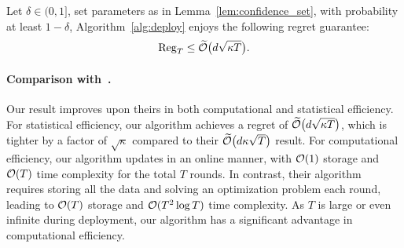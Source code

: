 \begin{myThm}
    \label{thm:deploy}
    Let $\delta \in(0,1]$, set parameters as in Lemma~\ref{lem:confidence_set}, with probability at least $1-\delta$, Algorithm~\ref{alg:deploy} enjoys the following regret guarantee:
    \begin{align*}
      {\operatorname*{Reg}}_T \leq \widetilde{\mathcal{O}} \big(d\sqrt{{\kappa}{T}}\big).
    \end{align*}
\end{myThm}

\paragraph{Comparison with~\citet{NeurIPS'21:Saha-Preference-bandits}.} Our result improves upon theirs in both computational and statistical efficiency. For statistical efficiency, our algorithm achieves a regret of $\widetilde{\mathcal{O}} \big(d\sqrt{{\kappa}{T}}\big)$, which is tighter by a factor of $\sqrt{\kappa}$ compared to their $\widetilde{\mathcal{O}} \big(d{\kappa}\sqrt{{T}}\big)$ result. For computational efficiency, our algorithm updates in an online manner, with $\mathcal{O}(1)$ storage and $\mathcal{O}(T)$ time complexity for the total $T$ rounds. In contrast, their algorithm requires storing all the data and solving an optimization problem each round, leading to $\mathcal{O}(T)$ storage and $\mathcal{O}(T^2 \log T)$ time complexity. As $T$ is large or even infinite during deployment, our algorithm has a significant advantage in computational efficiency. 

